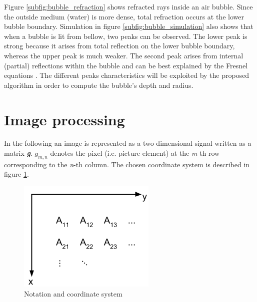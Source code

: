 			Figure \ref{subfig:bubble_refraction} shows refracted rays inside an air bubble. Since the outside medium (water) is more dense, total refraction occurs at the lower bubble boundary. Simulation in figure \ref{subfig:bubble_simulation} also shows that when a bubble is lit from bellow, two peaks can be observed. The lower peak is strong because it arises from total reflection on the lower bubble boundary, whereas the upper peak is much weaker. The second peak arises from internal (partial) reflections within the bubble and can be best explained by the Fresnel equations \citep{Demtroeder2}. 
			The different peaks characteristics will be exploited by the proposed algorithm in order to compute the bubble's depth and radius.
			
			
	
	\section{Image processing}	\label{image_processing}
	In the following an image is represented as a two dimensional signal written as a matrix \textit{\textbf{g}}. $g_{m,n}$ denotes the pixel (i.e. picture element) at the \textit{m}-th row corresponding to the \textit{n}-th column. The chosen coordinate system is described in figure \ref{fig:coord_sys}. 
	
		\begin{figure}
		    \centering
		    \includegraphics[scale=0.4]{images/coord_sys.png}
		    \caption{Notation and coordinate system}
		    \label{fig:coord_sys}
		\end{figure}
	
